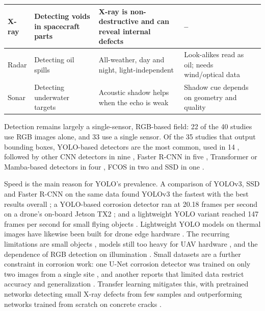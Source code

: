 {\begin{xltabular}{\textwidth}{>{\RaggedRight\arraybackslash}p{2.1cm}>{\RaggedRight\arraybackslash}p{2.9cm}>{\RaggedRight\arraybackslash}X>{\RaggedRight\arraybackslash}Xp{0.95cm}}
\midrule
X-ray & Detecting voids in spacecraft parts & X-ray is non-destructive and can reveal internal defects & -- & \citep{Gong2022} \\
\midrule
Radar & Detecting oil spills & All-weather, day and night, light-independent & Look-alikes read as oil; needs wind/optical data & \citep{Zhao2026} \\
\midrule
Sonar & Detecting underwater targets & Acoustic shadow helps when the echo is weak & Shadow cue depends on geometry and quality & \citep{He2026} \\
\end{xltabular}
}


Detection remains largely a single-sensor, RGB-based field: 22 of the 40 studies
use RGB images alone, and 33 use a single sensor. Of the 35 studies that output
bounding boxes, YOLO-based detectors are the most common, used in 14
\citep{Srivastava2021,Tao2021,Sun2023,Liu2026a,Wang2026a,Sun2022,Li2024b,Morita2024,Zhao2026,Hou2024,Liu2026c,Wang2024b,Wen2025,Yu2023}, followed by other
CNN detectors in nine \citep{Jiang2025,Mbietieu2025,Lalitha2022,He2026,Chang2024,Jiang2024,Naich2024,Prasanth2026,Soumya2026}, Faster R-CNN in
five \citep{Wu2026,Wu2023,Zheng2023,Gong2022,Lim2021}, Transformer or Mamba-based detectors in four
\citep{Zhang2026c,Cheng2025,Wang2026b,Tran2025}, FCOS in two \citep{Chen2025,Zhang2024} and SSD in one \citep{Han2022}.

Speed is the main reason for YOLO's prevalence. A comparison of YOLOv3, SSD and
Faster R-CNN on the same data found YOLOv3 the fastest with the best results
overall \citep{Srivastava2021}; a YOLO-based corrosion detector ran at 20.18 frames per second on
a drone's on-board Jetson TX2 \citep{Yu2023}; and a lightweight YOLO variant reached 147
frames per second for small flying objects \citep{Tao2021}. Lightweight YOLO models on
thermal images have likewise been built for drone edge hardware \citep{Liu2026c,Wang2024b,Wen2025}.
The recurring limitations are small objects \citep{Zhang2024,Srivastava2021,Chen2025}, models still too
heavy for UAV hardware \citep{Jiang2025,Sun2023}, and the dependence of RGB detection on
illumination \citep{Zhang2024,Lalitha2022,Wu2023,Wu2026}. Small datasets are a further constraint in
corrosion work: one U-Net corrosion detector was trained on only two images from
a single site \citep{Suzuki2026}, and another reports that limited data restrict accuracy and
generalization \citep{Hu2023}. Transfer learning mitigates this, with pretrained networks
detecting small X-ray defects from few samples \citep{Gong2022} and outperforming networks
trained from scratch on concrete cracks \citep{Su2024}.

